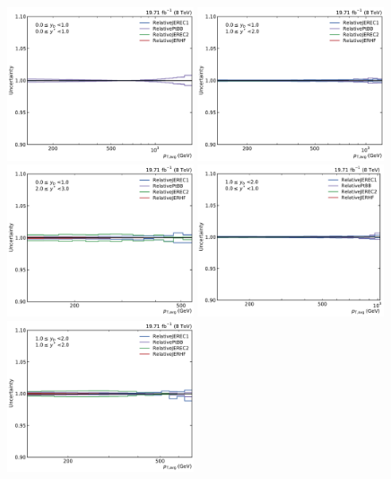 \begin{figure}[htbp]
    \centering
    \includegraphics[width=0.49\textwidth]{figures/measurement/jec_relunc_2_yb0ys0.pdf}\hfill
    \includegraphics[width=0.49\textwidth]{figures/measurement/jec_relunc_2_yb0ys1.pdf}
    \includegraphics[width=0.49\textwidth]{figures/measurement/jec_relunc_2_yb0ys2.pdf}\hfill
    \includegraphics[width=0.49\textwidth]{figures/measurement/jec_relunc_2_yb1ys0.pdf}
    \includegraphics[width=0.49\textwidth]{figures/measurement/jec_relunc_2_yb1ys1.pdf}\hfill

\end{figure}

